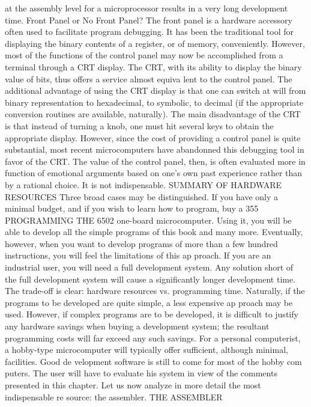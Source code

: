 \documentclass{book}
\begin{document}
{{{{{{{{{{{{{{{{{{{{{{{{{{{{{{{{{{{{{{{{{{{{{{{{{{{{{{{{{{{{{{{{{{{{{{{{{{{{{{{{{{{{{{{{{{{{{{{{{{{{{{{{{{{{{{{{{{{{{{{{{{{{{{{{{{{{{{{{{{{{at the assembly level for a microprocessor results in a very long
development time.
Front Panel or No Front Panel?
The front panel is a hardware accessory often used to facilitate
program debugging. It has been the traditional tool for displaying the
binary contents of a register, or of memory, conveniently. However,
most of the functions of the control panel may now be accomplished
from a terminal through a CRT display. The CRT, with its ability to
display the binary value of bits, thus offers a service almost equiva
lent to the control panel. The additional advantage of using the CRT
display is that one can switch at will from binary representation to
hexadecimal, to symbolic, to decimal (if the appropriate conversion
routines are available, naturally). The main disadvantage of the CRT
is that instead of turning a knob, one must hit several keys to obtain
the appropriate display. However, since the cost of providing a
control panel is quite substantial, most recent microcomputers have
abandonned this debugging tool in favor of the CRT. The value of
the control panel, then, is often evaluated more in function of
emotional arguments based on one's own past experience rather than
by a rational choice. It is not indispensable.
SUMMARY OF HARDWARE RESOURCES
Three broad cases may be distinguished. If you have only a
minimal budget, and if you wish to learn how to program, buy a
355
PROGRAMMING THE 6502
one-board microcomputer. Using it, you will be able to develop all
the simple programs of this book and many more. Eventually,
however, when you want to develop programs of more than a few
hundred instructions, you will feel the limitations of this ap
proach.
If you are an industrial user, you will need a full development
system. Any solution short of the full development system will
cause a significantly longer development time. The trade-off is
clear: hardware resources vs. programming time. Naturally, if the
programs to be developed are quite simple, a less expensive ap
proach may be used. However, if complex programs are to be
developed, it is difficult to justify any hardware savings when
buying a development system; the resultant programming costs will
far exceed any such savings.
For a personal computerist, a hobby-type microcomputer will
typically offer sufficient, although minimal, facilities. Good de
velopment software is still to come for most of the hobby com
puters. The user will have to evaluate his system in view of the
comments presented in this chapter.
Let us now analyze in more detail the most indispensable re
source: the assembler.
THE ASSEMBLER
}}}}}}}}}}}}}}}}}}}}}}}}}}}}}}}}}}}}}}}}}}}}}}}}}}}}}}}}}}}}}}}}}}}}}}}}}}}}}}}}}}}}}}}}}}}}}}}}}}}}}}}}}}}}}}}}}}}}}}}}}}}}}}}}}}}}}}}}}}}}
\end{document}

